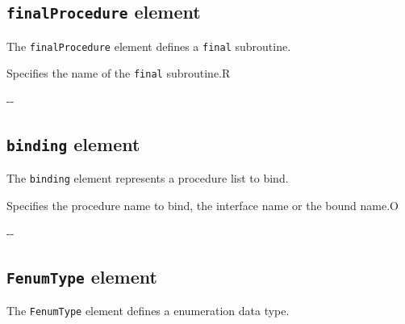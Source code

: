 \subsection{ {\tt finalProcedure} element}

The {\tt finalProcedure} element defines a {\tt final} subroutine.


\begin{XcodeMLChildElements}
{Specifies the name of the {\tt final} subroutine.}{R}
\end{XcodeMLChildElements}

\begin{XcodeMLAttributes}
\XcodeMLAttrDef{-}{-}
{-}{-}
\end{XcodeMLAttributes}


\subsection{ {\tt binding} element}

The {\tt binding} element represents a procedure list to bind.


\begin{XcodeMLChildElements}
{Specifies the procedure name to bind, the interface name or the bound name.}{O}
\end{XcodeMLChildElements}

\begin{XcodeMLAttributes}
\XcodeMLAttrDef{-}{-}
{-}{-}
\end{XcodeMLAttributes}


\subsection{ {\tt FenumType} element}

The {\tt FenumType} element defines a enumeration data type.


